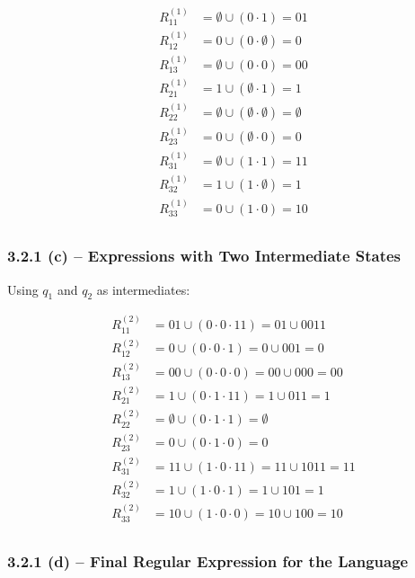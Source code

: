\documentclass{article}
\theoremstyle{theorem}
\theoremstyle{definition}
\theoremstyle{remark}
\begin{document}
\[
\begin{aligned}
R_{11}^{(1)} &= \emptyset \cup (0 \cdot 1) = 01 \\
R_{12}^{(1)} &= 0 \cup (0 \cdot \emptyset) = 0 \\
R_{13}^{(1)} &= \emptyset \cup (0 \cdot 0) = 00 \\
R_{21}^{(1)} &= 1 \cup (\emptyset \cdot 1) = 1 \\
R_{22}^{(1)} &= \emptyset \cup (\emptyset \cdot \emptyset) = \emptyset \\
R_{23}^{(1)} &= 0 \cup (\emptyset \cdot 0) = 0 \\
R_{31}^{(1)} &= \emptyset \cup (1 \cdot 1) = 11 \\
R_{32}^{(1)} &= 1 \cup (1 \cdot \emptyset) = 1 \\
R_{33}^{(1)} &= 0 \cup (1 \cdot 0) = 10 \\
\end{aligned}
\]

\subsubsection*{3.2.1 (c) – Expressions with Two Intermediate States}

Using \( q_1 \) and \( q_2 \) as intermediates:

\[
\begin{aligned}
R_{11}^{(2)} &= 01 \cup (0 \cdot 0 \cdot 11) = 01 \cup 0011 \\
R_{12}^{(2)} &= 0 \cup (0 \cdot 0 \cdot 1) = 0 \cup 001 = 0 \\
R_{13}^{(2)} &= 00 \cup (0 \cdot 0 \cdot 0) = 00 \cup 000 = 00 \\
R_{21}^{(2)} &= 1 \cup (0 \cdot 1 \cdot 11) = 1 \cup 011 = 1 \\
R_{22}^{(2)} &= \emptyset \cup (0 \cdot 1 \cdot 1) = \emptyset \\
R_{23}^{(2)} &= 0 \cup (0 \cdot 1 \cdot 0) = 0 \\
R_{31}^{(2)} &= 11 \cup (1 \cdot 0 \cdot 11) = 11 \cup 1011 = 11 \\
R_{32}^{(2)} &= 1 \cup (1 \cdot 0 \cdot 1) = 1 \cup 101 = 1 \\
R_{33}^{(2)} &= 10 \cup (1 \cdot 0 \cdot 0) = 10 \cup 100 = 10 \\
\end{aligned}
\]

\subsubsection*{3.2.1 (d) – Final Regular Expression for the Language}
\end{document}
